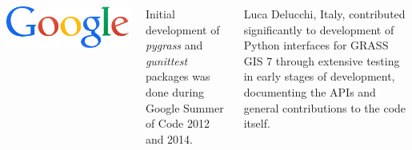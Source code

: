 \documentclass[innermargin=10mm]{tikzposter}
\newlength{\logowidth}
\newcommand{\pkg}[1]{\emph{#1}}
\begin{document}
\begin{columns}
{\bigskip

\begin{minipage}{\listlogowidth}
\includegraphics[width=\linewidth]{google}
\end{minipage}
\listhspace
\begin{minipage}{\listtextwidth}
Initial development of \pkg{pygrass} and \pkg{gunittest} packages was done during Google Summer of Code 2012 and 2014.
\end{minipage}

\bigskip

Luca Delucchi, Italy, contributed significantly to development of Python interfaces for GRASS GIS 7
through extensive testing in early stages of development, documenting the APIs
and general contributions to the code itself.


}
\end{columns}
\end{document}

